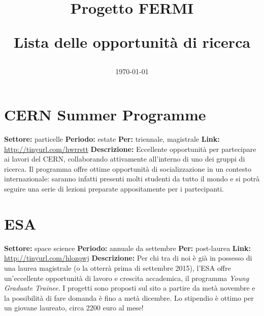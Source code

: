 \documentclass[a4paper,10pt]{article}
\title{Progetto FERMI\\
  \begin{large}
    Lista delle opportunità di ricerca
  \end{large}}
\date{\today} %
\begin{document}
\maketitle
{}
\tableofcontents


\section{CERN Summer Programme}

\textbf{Settore:} particelle \newline %
\textbf{Periodo:} estate \newline
\textbf{Per:} triennale, magistrale \newline
\textbf{Link:}	\url{http://tinyurl.com/hwrrstt} \newline %
\textbf{Descrizione:} Eccellente opportunità per partecipare ai lavori del CERN, collaborando attivamente all’interno di uno dei gruppi di ricerca. Il programma offre ottime opportunità di socializzazione in un contesto internazionale: saranno infatti presenti molti studenti da tutto il mondo e si potrà seguire una serie di lezioni preparate appositamente per i partecipanti.	


\section{ESA} 

\textbf{Settore:} space science \newline
\textbf{Periodo:} annuale da settembre \newline
\textbf{Per:} post-laurea \newline
\textbf{Link:} \url{http://tinyurl.com/hlozqwj} \newline
\textbf{Descrizione:} Per chi tra di noi è già in possesso di una laurea magistrale (o la otterrà prima di settembre 2015), l'ESA offre un'eccellente opportunità di lavoro e crescita accademica, il programma \emph{Young Graduate Trainee}. I progetti sono proposti sul sito a partire da metà novembre e la possibilità di fare domanda è fino a metà dicembre. Lo stipendio è ottimo per un giovane laureato, circa 2200 euro al mese!
\end{document}
